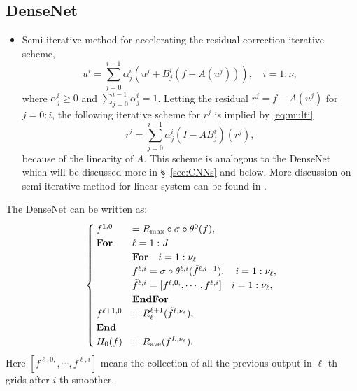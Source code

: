 \subsection{DenseNet} 
\begin{itemize}
	\item Semi-iterative method for accelerating the residual correction iterative scheme,
	\begin{equation}\label{eq:multi}
	u^{i} = \sum_{j=0}^{i-1}  \alpha_{j}^i\left( u^{j} + B^{i}_j(f - A(u^j)) \right), \quad i=1:\nu,
	\end{equation}
	where $\alpha_j^i \ge 0$ and $\sum_{j=0}^{i-1}  \alpha_{j}^i = 1$.
	Letting the residual $r^j = f - A(u^{j})$ for $j=0:i$, 
	the following iterative scheme for $r^j$ is implied by \eqref{eq:multi}
	\begin{equation}\label{eq:multi-res}
	r^{i} = \sum_{j=0}^{i-1}\alpha^i_j(I - AB^{i}_j)(r^j),
	\end{equation}
	because of the linearity of $A$. This scheme is analogous to the 
	DenseNet \cite{huang2017densely} which will be discussed more in \S~\ref{sec:CNNs} and below.
	More discussion on semi-iterative method for linear system 
	can be found in \cite{hackbusch1994iterative, golub2012matrix}.
\end{itemize}


The DenseNet \cite{huang2017densely} can be written as:
\begin{equation}\label{eq:densenet}
\begin{cases}
f^{1,0} &=R_{\rm max}\circ \sigma \circ \theta^0(f), \\
\text{\bf For} &\ell = 1:J \\
\quad &\text{\bf For} \quad i = 1:\nu_\ell \\
&f^{\ell,i} = \sigma \circ \theta^{\ell,i} (\tilde f^{\ell,i-1}), \quad i = 1:\nu_\ell ,\\
&\tilde f^{\ell,i} = [f^{\ell,0,}, \cdots, f^{\ell,i}] \quad i = 1:\nu_\ell  , \\
\quad &\text{\bf EndFor} \\
f^{\ell+1,0} &=  R_\ell^{\ell+1} (\tilde f^{\ell, \nu_\ell} ) , \\
\text{\bf End} &\\
H_0(f) &=  R_{\rm ave}(f^{L,\nu_\ell}). \\
\end{cases}
\end{equation}
Here $[f^{\ell,0,}, \cdots, f^{\ell,i}]$ means the collection of 
all the previous output in $\ell$-th grids after $i$-th smoother.


